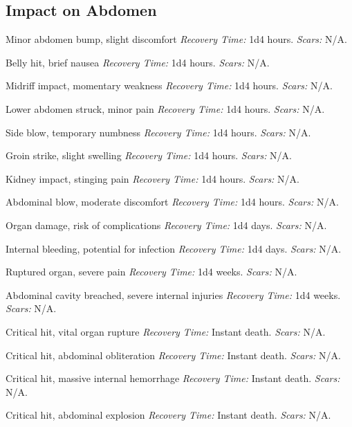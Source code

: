 \documentclass[12pt]{book}  %
\begin{document}
\subsection{Impact on Abdomen}

\begin{description}[labelwidth=1.5em, leftmargin=*, itemsep=0.4em]
    \item[1 -] Minor abdomen bump, slight discomfort \textit{Recovery Time:} 1d4 hours. \textit{Scars:} N/A.
    \item[2 -] Belly hit, brief nausea \textit{Recovery Time:} 1d4 hours. \textit{Scars:} N/A.
    \item[3 -] Midriff impact, momentary weakness \textit{Recovery Time:} 1d4 hours. \textit{Scars:} N/A.
    \item[4 -] Lower abdomen struck, minor pain \textit{Recovery Time:} 1d4 hours. \textit{Scars:} N/A.
    \item[5 -] Side blow, temporary numbness \textit{Recovery Time:} 1d4 hours. \textit{Scars:} N/A.
    \item[6 -] Groin strike, slight swelling \textit{Recovery Time:} 1d4 hours. \textit{Scars:} N/A.
    \item[7 -] Kidney impact, stinging pain \textit{Recovery Time:} 1d4 hours. \textit{Scars:} N/A.
    \item[8 -] Abdominal blow, moderate discomfort \textit{Recovery Time:} 1d4 hours. \textit{Scars:} N/A.
    \item[9 -] Organ damage, risk of complications \textit{Recovery Time:} 1d4 days. \textit{Scars:} N/A.
    \item[10 -] Internal bleeding, potential for infection \textit{Recovery Time:} 1d4 days. \textit{Scars:} N/A.
    \item[11 -] Ruptured organ, severe pain \textit{Recovery Time:} 1d4 weeks. \textit{Scars:} N/A.
    \item[12 -] Abdominal cavity breached, severe internal injuries \textit{Recovery Time:} 1d4 weeks. \textit{Scars:} N/A.
    \item[13 -] Critical hit, vital organ rupture \textit{Recovery Time:} Instant death. \textit{Scars:} N/A.
    \item[14 -] Critical hit, abdominal obliteration \textit{Recovery Time:} Instant death. \textit{Scars:} N/A.
    \item[15 -] Critical hit, massive internal hemorrhage \textit{Recovery Time:} Instant death. \textit{Scars:} N/A.
    \item[16 -] Critical hit, abdominal explosion \textit{Recovery Time:} Instant death. \textit{Scars:} N/A.

\end{description}
\end{document}
